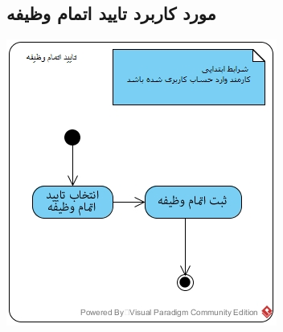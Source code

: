 \documentclass{article}
\begin{document}
\subsection*{مورد کاربرد تایید اتمام وظیفه}
\vspace{2cm}
\begin{center}
\includegraphics[width=\textwidth]{ActivityDiagrams/30.jpg}
\end{center}

\newpage
\vspace{2cm}
\end{document}
